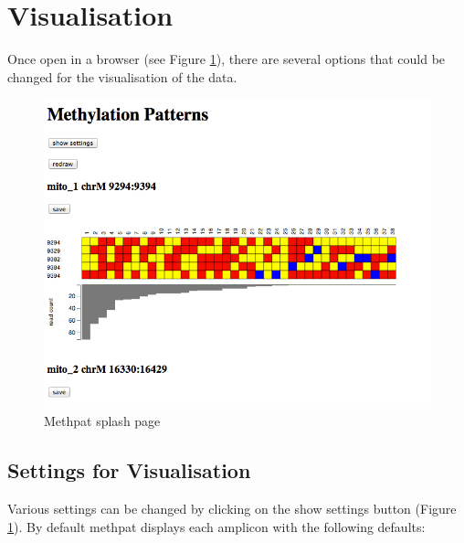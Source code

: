 \documentclass[11pt,a4paper]{article}
\begin{document}
\section{Visualisation}
Once open in a browser (see Figure \ref{fig:methpat1}), there are several options that could be changed for the visualisation of the data.
\begin{figure}[H] %
   \centering
   \includegraphics[scale=0.65]{methpat001.png} 
   \caption{Methpat splash page}
   \label{fig:methpat1}
\end{figure}

\subsection{Settings for Visualisation}
Various settings can be changed by clicking on the show settings button (Figure \ref{fig:methpat1}). By default methpat displays each amplicon with the following defaults:
\end{document}
